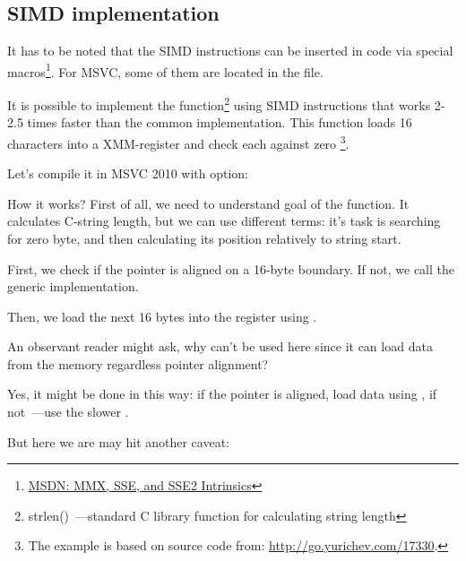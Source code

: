 ﻿\subsection{SIMD \strlen implementation}
\label{SIMD_strlen}

\newcommand{\URLMSDNSSE}{\href{http://go.yurichev.com/17262}{MSDN: MMX, SSE, and SSE2 Intrinsics}}

It has to be noted that the \ac{SIMD} instructions can be inserted in \CCpp code via special macros\footnote{\URLMSDNSSE}.
For MSVC, some of them are located in the  file.

\newcommand{\URLSTRLEN}{http://go.yurichev.com/17330}


It is possible to implement the \strlen function\footnote{strlen()~---standard C library function for calculating
string length} using SIMD instructions that works 2-2.5 times faster than the common implementation.
This function loads 16 characters into a XMM-register and check each against zero
\footnote{
The example is based on source code from: \url{\URLSTRLEN}.}.



Let's compile it in MSVC 2010 with \Ox option:



How it works?
First of all, we need to understand goal of the function.
It calculates C-string length, but we can use different terms: it's task is searching for zero byte, and then calculating its position relatively to string start.

First, we check if the  pointer is aligned on a 16-byte boundary.
If not, we call the generic \strlen implementation.

Then, we load the next 16 bytes into the  register using \MOVDQA.

An observant reader might ask, why can't \MOVDQU be used here since it can load data from the memory
regardless pointer alignment?

Yes, it might be done in this way: if the pointer is aligned, load data using \MOVDQA,
if not~---use the slower \MOVDQU.

But here we are may hit another caveat:

\newcommand{\URLPAGE}{\href{http://go.yurichev.com/17136}{wikipedia}}

